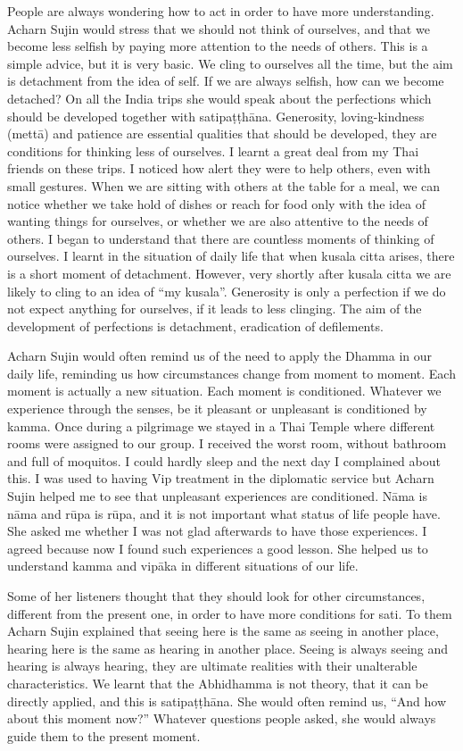People are always wondering how to act in order to have more understanding. Acharn Sujin would stress that we should not think of ourselves, and that we become less selfish by paying more attention to the needs of others. This is a simple advice, but it is very basic. We cling to ourselves all the time, but the aim is detachment from the idea of self. If we are always selfish, how can we become detached? On all the India trips she would speak about the perfections which should be developed together with satipaṭṭhāna. Generosity, loving-kindness (mettā) and patience are essential qualities that should be developed, they are conditions for thinking less of ourselves. I learnt a great deal from my Thai friends on these trips. I noticed how alert they were to help others, even with small gestures. When we are sitting with others at the table for a meal, we can notice whether we take hold of dishes or reach for food only with the idea of wanting things for ourselves, or whether we are also attentive to the needs of others. I began to understand that there are countless moments of thinking of ourselves. I learnt in the situation of daily life that when kusala citta arises, there is a short moment of detachment. However, very shortly after kusala citta we are likely to cling to an idea of ``my kusala”. Generosity is only a perfection if we do not expect anything for ourselves, if it leads to less clinging. The aim of the development of perfections is detachment, eradication of defilements.

Acharn Sujin would often remind us of the need to apply the Dhamma in our daily life, reminding us how circumstances change from moment to moment. Each moment is actually a new situation. Each moment is conditioned. Whatever we experience through the senses, be it pleasant or unpleasant is conditioned by kamma. Once during a pilgrimage we stayed in a Thai Temple where different rooms were assigned to our group. I received the worst room, without bathroom and full of moquitos. I could hardly sleep and the next day I complained about this. I was used to having Vip treatment in the diplomatic service but Acharn Sujin helped me to see that unpleasant experiences are conditioned. Nāma is nāma and rūpa is rūpa, and it is not important what status of life people have. She asked me whether I was not glad afterwards to have those experiences. I agreed because now I found such experiences a good lesson. She helped us to understand kamma and vipāka in different situations of our life.

Some of her listeners thought that they should look for other circumstances, different from the present one, in order to have more conditions for sati. To them Acharn Sujin explained that seeing here is the same as seeing in another place, hearing here is the same as hearing in another place. Seeing is always seeing and hearing is always hearing, they are ultimate realities with their unalterable characteristics. We learnt that the Abhidhamma is not theory, that it can be directly applied, and this is satipaṭṭhāna. She would often remind us, ``And how about this moment now?'' Whatever questions people asked, she would always guide them to the present moment.

